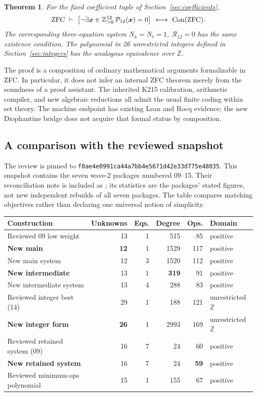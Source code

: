 \documentclass[11pt,letterpaper]{article}
\newtheorem{theorem}{Theorem}[section]
\theoremstyle{remark}\newtheorem{remark}[theorem]{Remark}
\newcommand{\Z}{\mathbb Z}\newcommand{\N}{\mathbb N}\newcommand{\pos}{\mathbb Z_{>0}}
\newcommand{\Con}{\operatorname{Con}}\newcommand{\Res}{\operatorname{Res}}
\newcommand{\pin}{\texttt{f0ae4e0991ca44a7bb4e5671d42e33d775e48035}}
\newcommand{\pathtext}[1]{\texttt{\detokenize{#1}}}
\newcommand{\IntegerDegree}{2993}
\newcommand{\IntegerOps}{169}
\begin{document}
\begin{theorem}\label{thm:main}
For the fixed coefficient tuple of Section~\ref{sec:coefficients},
\[
 \mathrm{ZFC}\ \vdash\
 \bigl[\neg\exists\boldsymbol{x}\in\pos^{12}\,
       \PS_{12}(\boldsymbol{x})=0\bigr]
 \ \longleftrightarrow\ \Con(\mathrm{ZFC}).
\]
The corresponding three-equation system $N_k=N_t=1$, $\mathcal R_{12}=0$
has the same existence condition. The polynomial in 26 unrestricted integers
defined in Section~\ref{sec:integers} has the analogous equivalence over $\Z$.
\end{theorem}

The proof is a composition of ordinary mathematical arguments formalizable in
ZFC. In particular, it does not infer an internal ZFC theorem merely from the
soundness of a proof assistant. The inherited K215 calibration, arithmetic
compiler, and new algebraic reductions all admit the usual finite coding
within set theory. The machine endpoint has existing Lean and Rocq evidence;
the new Diophantine bridge does not acquire that formal status by composition.

\subsection{A comparison with the reviewed snapshot}
The review is pinned to \pin. This snapshot contains the seven wave-2 packages
numbered 09--15. Their reconciliation note is included as
\pathtext{reference/comparison_at_pin.md}; its statistics are the packages'
stated figures, not new independent rebuilds of all seven packages.
The table compares matching objectives rather than declaring one universal
notion of simplicity.

\begin{center}\small
\begin{tabular}{>{\raggedright\arraybackslash}p{3.4cm}rrrrp{2.2cm}}
\toprule
Construction & Unknowns & Eqs. & Degree & Ops. & Domain\\
\midrule
Reviewed 09 low weight &13&1&515&85&positive\\
\textbf{New main} &\textbf{12}&1&1529&117&positive\\
New main system &12&3&1520&112&positive\\
\textbf{New intermediate} &13&1&\textbf{319}&91&positive\\
New intermediate system &13&4&288&83&positive\\
Reviewed integer best (14) &29&1&188&121&unrestricted $\Z$\\
\textbf{New integer form} &\textbf{26}&1&\IntegerDegree&\IntegerOps&unrestricted $\Z$\\
Reviewed retained system (09) &16&7&24&60&positive\\
\textbf{New retained system} &16&7&24&\textbf{59}&positive\\
Reviewed minimum-ops polynomial &15&1&155&67&positive\\
\bottomrule
\end{tabular}
\end{center}
\end{document}
